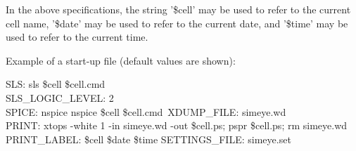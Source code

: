 \par
In the above specifications, the string '\$cell' may be used
to refer to the current cell name, '\$date' may be used to
refer to the current date, and '\$time' may be used to refer
to the current time.
\par
Example of a start-up file (default values are shown):
\par
SLS: sls \$cell \$cell.cmd\\
SLS\_LOGIC\_LEVEL: 2\\
SPICE: nspice  nspice \$cell \$cell.cmd\
XDUMP\_FILE: simeye.wd\\   
PRINT: xtops -white 1 -in simeye.wd -out \$cell.ps; pspr \$cell.ps; rm simeye.wd\\
PRINT\_LABEL: \$cell  \$date  \$time
SETTINGS\_FILE: simeye.set


